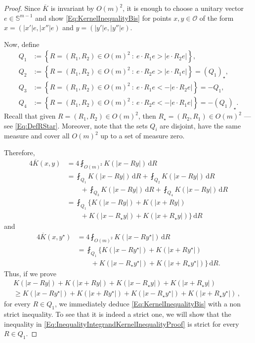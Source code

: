 \documentclass[12pt,reqno]{amsart}
\theoremstyle{definition}
\theoremstyle{remark}
\newcommand{\con}[1]{\mathbb{#1}}
\newcommand{\Sph}{\con{S}} %
\newcommand{\ocal}{\mathcal{O}}
\renewcommand{\d}{\,\mathrm{d}} %
\newcommand{\setcond}[2]{\left \{ #1 \ : \ #2  \right \}}
\newcommand{\average}{\fint}
\numberwithin{equation}{section}
\begin{document}
	\begin{proof}
		Since $\overline{K}$ is invariant by $O(m)^2$, it is enough to choose a unitary vector $e \in \Sph^{m-1}$ and show \eqref{Eq:KernelInequalityBis} for points $x, y\in \ocal$ of the form $x = (|x'|e, |x''|e)$ and $y = (|y'|e, |y''|e)$.
		
		Now, define
		\begin{equation}
		\label{Eq:DefQ}
		\begin{split}
		Q_1 &:= \setcond{R = (R_1,R_2) \in O(m)^2}{e\cdot R_1 e > |e\cdot R_2 e|},\\
		Q_2 &:= \setcond{R = (R_1,R_2) \in O(m)^2}{e\cdot R_2 e > |e\cdot R_1 e|} = (Q_1)_\star,\\
		Q_3 &:= \setcond{R = (R_1,R_2) \in O(m)^2}{e\cdot R_1 e < -|e\cdot R_2 e|} = -Q_1,\\
		Q_4 &:= \setcond{R = (R_1,R_2) \in O(m)^2}{e\cdot R_2 e < - |e\cdot R_1 e|} = -(Q_1)_\star.
		\end{split}
		\end{equation}
		Recall that given $R=(R_1,R_2)\in O(m)^2$, then $R_\star=(R_2,R_1)\in O(m)^2$ ---see \eqref{Eq:DefRStar}. Moreover, note that the sets $Q_i$ are disjoint, have the same measure and cover all $O(m)^2$ up to a set of measure zero. 
		
		Therefore,
		\begin{align*}
		4\overline{K} (x, y) &= 4\average_{O(m)^2} K(|x - R y|)\d R \\
		& = \average_{Q_1} K(|x - R y|)\d R + \average_{Q_2} K(|x - R y|)\d R \\
		& \quad \quad
		+ \average_{Q_3} K(|x - R y|)\d R +
		\average_{Q_4} K(|x - R y|)\d R \\
		&= \average_{Q_1} \{K(|x - R y|) + K(|x + R y|) \\
		&\quad \quad + K(|x - R_\star y|) + K(|x + R_\star y|)\}\d R
		\end{align*}
		and
		\begin{align*}
		4\overline{K} (x, y^\star) &= 4\average_{O(m)^2} K(|x - R y^\star|)\d R \\
		& = \average_{Q_1} \{K(|x - R y^\star|) + K(|x + R y^\star|) \\
		&\quad \quad + K(|x - R_\star y^\star|) + K(|x + R_\star y^\star|)\}\d R.
		\end{align*}
		Thus, if we prove
		\begin{equation}
		\label{Eq:InequalityIntegrandKernelInequalityProof}
		\begin{split}
		K(|x - R y|) + K(|x + R y|) + K(|x - R_\star y|) + K(|x + R_\star y|)
		\quad \quad \quad \quad 
		\\
		\geq
		K(|x - R y^\star|) + K(|x + R y^\star|)+K(|x - R_\star y^\star|) + K(|x + R_\star y^\star|)\,,
		\end{split}
		\end{equation}
		for every $R\in Q_1$, we immediately deduce \eqref{Eq:KernelInequalityBis} with a non strict inequality. To see that it is indeed a strict one, we will show that the inequality in \eqref{Eq:InequalityIntegrandKernelInequalityProof} is strict for every $R \in Q_1$.
		

\end{proof}
\end{document}
